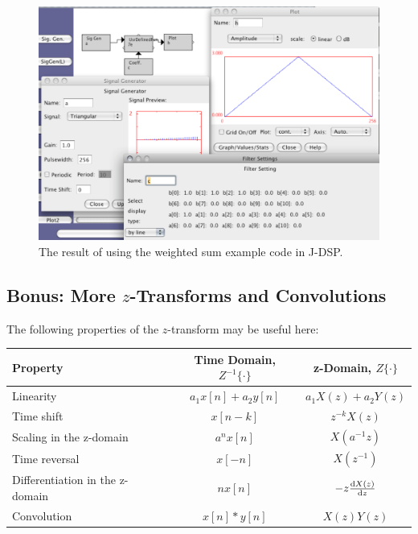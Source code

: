  \begin{figure}[h]
    \begin{center}     
        \includegraphics[width=6in]{lab6/function1examplewithplot}
        \caption{The result of using the weighted sum example code in J-DSP.}
    \end{center}
    \label{fg:userdefexample}
  \end{figure}

\subsection{Bonus: More $z$-Transforms and Convolutions}

The following properties of the $z$-transform may be useful here:

\begin{center}
\begin{tabular}{|l|c|c|} \hline
Property      & Time Domain, $Z^{-1}\{\cdot\}$ & z-Domain, $Z\{\cdot\}$ \\ \hline\hline
Linearity     & $a_1x[n]+a_2y[n]$ & $a_1X(z)+a_2Y(z)$\\ 
Time shift    & $x[n-k]$       & $z^{-k}X(z)$\\ 
Scaling in the z-domain 
              & $a^nx[n]$        & $X(a^{-1}z)$ \\ 
Time reversal & $x[-n]$        & $X(z^{-1})$\\ 
Differentiation in the z-domain 
              & $nx[n]$          & $-z \frac{\mathrm{d} X(z)}{\mathrm{d} z}$ \\ 
Convolution   & $x[n] \ast y[n]$       & $X(z)Y(z)$ \\ \hline
\end{tabular}
\end{center}



